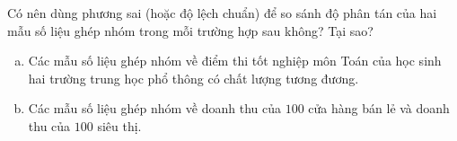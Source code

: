 \begin{bt}%

	Có nên dùng phương sai (hoặc độ lệch chuẩn) để so sánh độ phân tán của hai mẫu số liệu ghép nhóm trong mỗi trường hợp sau không? Tại sao?
	\begin{enumerate}[a)]
	\item  Các mẫu số liệu ghép nhóm về điểm thi tốt nghiệp môn Toán của học sinh hai trường trung học phổ thông có chất lượng tương đương.
	\item Các mẫu số liệu ghép nhóm về doanh thu của $100$ cửa hàng bán lẻ và doanh thu của $100$ siêu thị.
	\end{enumerate}
\end{bt}

